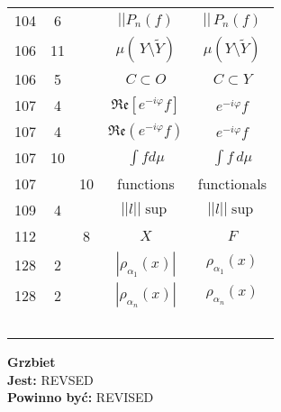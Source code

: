 \documentclass[a4paper,11pt]{article}
\newcommand{\wt}{\widetilde}
\newcommand{\mf}{\mathfrak}
\newcommand{\al}{\alpha}
\newcommand{\vp}{\varphi}
\newcommand{\subs}{\subset}
\newcommand{\setm}{\setminus}
\newcommand{\Real}{\mf{Re}}
\newcommand{\Int}{\int\limits}
\newcommand{\IntCaD}[2] { \Int #1 \, d#2 } %
\newcommand{\norm}[1]{\left|\left| #1 \right|\right|}
\newcommand{\tb}{\textbf}
\newcommand{\noi}{\noindent}
\newcommand{\Jest}{\tb{Jest: }}
\newcommand{\Pow}{\tb{Powinno być: }}
\begin{document}
\begin{center}
\begin{tabular}{|c|c|c|c|c|}
    104 & 6 & & $||P_{ n }( f )$ & $|| \, P_{ n }( f )$ \\
    106 & 11 & & $\mu( \, Y \setm \wt{ Y } )$
           & $\mu( Y \setm \wt{ Y } )$ \\
    106 & 5 & & $C \subs O$ & $C \subs Y$ \\
    107 & 4 & & $\Real[ e^{ -i \vp } f ]$ & $e^{ -i \vp } f$ \\
    107 & 4 & & $\Real( e^{ -i \vp } f )$ & $e^{ -i \vp } f$ \\
    107 & 10 & & $\int\! fd\mu$ & $\IntCaD{ f }{ \mu }$ \\
    107 & & 10 & functions & functionals \\
    109 & 4 & & $\norm{ l }\!\sup$ & $\norm{ l } \sup$ \\
    112 & & 8 & $X$ & $F$ \\
    128 & 2 & & $| \rho_{ \al_{ 1 } }( x ) |$ & $\rho_{ \al_{ 1 } }( x )$ \\
    128 & 2 & & $| \rho_{ \al_{ n } }( x ) |$ & $\rho_{ \al_{ n } }( x )$ \\
    & & & & \\
    & & & & \\
    & & & & \\
    & & & & \\
    & & & & \\ \hline
  \end{tabular}
\end{center}
\noi
\tb{Grzbiet} \\
\Jest REVSED \\
\Pow REVISED \\



 {}
\end{document}
